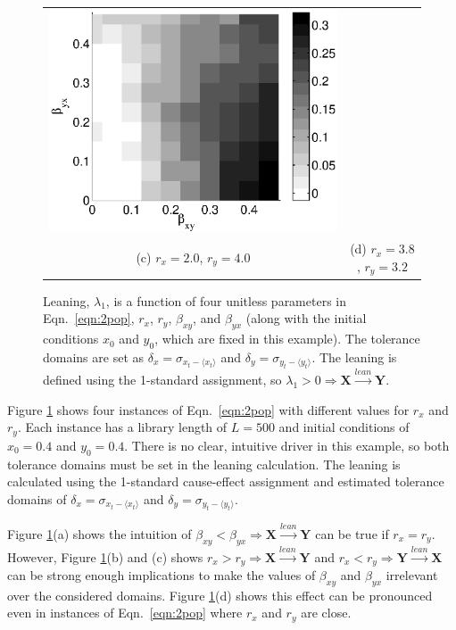 \documentclass[a4paper,11pt,twocolumn]{article}
\begin{document}
\begin{figure}[ht]
\begin{tabular}{cc}
\includegraphics[scale=0.30]{CoupLogexample_rx38ry32.eps} \\
(c) $r_x = 2.0$, $r_y = 4.0$ & (d) $r_x = 3.8$, $r_y = 3.2$ \\
\end{tabular}
\caption{Leaning, $\lambda_1$, is a function of four unitless parameters in Eqn.\ \ref{eqn:2pop}, $r_x$, $r_y$, $\beta_{xy}$, and $\beta_{yx}$ (along with the initial conditions $x_0$ and $y_0$, which are fixed in this example).  The tolerance domains are set as $\delta_x = \sigma_{x_t-\langle x_t \rangle}$ and $\delta_y = \sigma_{y_t-\langle y_t \rangle}$.  The leaning is defined using the 1-standard assignment, so $\lambda_1>0\Rightarrow\mathbf{X}\xrightarrow{lean}\mathbf{Y}$.}
\label{fig:2pop}
\end{figure}
Figure \ref{fig:2pop} shows four instances of Eqn.\ \ref{eqn:2pop} with different values for $r_x$ and $r_y$.  Each instance has a library length of $L=500$ and initial conditions of $x_0 = 0.4$ and $y_0 = 0.4$.  There is no clear, intuitive driver in this example, so both tolerance domains must be set in the leaning calculation.  The leaning is calculated using the 1-standard cause-effect assignment and estimated tolerance domains of $\delta_x = \sigma_{x_t-\langle x_t \rangle}$ and $\delta_y = \sigma_{y_t-\langle y_t \rangle}$.

Figure \ref{fig:2pop}(a) shows the intuition of $\beta_{xy}<\beta_{yx}\Rightarrow\mathbf{X}\xrightarrow{lean}\mathbf{Y}$ can be true if $r_x=r_y$.  However, Figure \ref{fig:2pop}(b) and (c) shows $r_x>r_y\Rightarrow\mathbf{X}\xrightarrow{lean}\mathbf{Y}$ and $r_x<r_y\Rightarrow\mathbf{Y}\xrightarrow{lean}\mathbf{X}$ can be strong enough implications to make the values of $\beta_{xy}$ and $\beta_{yx}$ irrelevant over the considered domains.  Figure \ref{fig:2pop}(d) shows this effect can be pronounced even in instances of Eqn.\ \ref{eqn:2pop} where $r_x$ and $r_y$ are close.  
\end{document}
